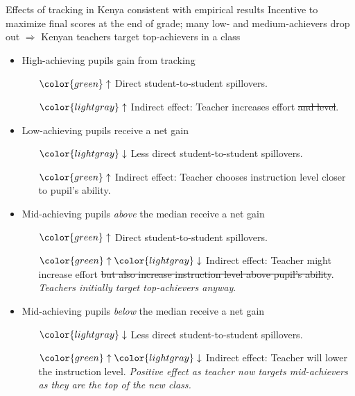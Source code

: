 \documentclass[9pt]{beamer}
\numberwithin{equation}{section}
\begin{document}
\begin{frame}{Effects of tracking in Kenya consistent with empirical results}
  Incentive to maximize final scores at the end of  grade; many low- and medium-achievers drop out $\Rightarrow$ Kenyan teachers target top-achievers in a class
  \begin{itemize}
    \item High-achieving pupils gain from tracking
    \begin{itemize}
      \item[$\color{green} \uparrow$] Direct student-to-student spillovers.
      \item[$\color{lightgray} \uparrow$] Indirect effect: Teacher increases effort \sout{and level}.
    \end{itemize}
    \item Low-achieving pupils receive a net gain
    \begin{itemize}
      \item[$\color{lightgray} \downarrow$] Less direct student-to-student spillovers.
      \item[$\color{green} \uparrow$] Indirect effect: Teacher chooses instruction level closer to pupil's ability.
    \end{itemize}
    \item Mid-achieving pupils \textit{above} the median receive a net gain
    \begin{itemize}
      \item[$\color{green}\uparrow$] Direct student-to-student spillovers.
      \item[$\color{green}\uparrow \color{lightgray}\downarrow$] Indirect effect: Teacher might increase effort \sout{but also increase instruction level above pupil's ability}. \textit{Teachers initially target top-achievers anyway}.
    \end{itemize}
    \item Mid-achieving pupils \textit{below} the median receive a net gain
    \begin{itemize}
      \item[$\color{lightgray} \downarrow$] Less direct student-to-student spillovers.
      \item[$\color{green}\uparrow \color{lightgray} \downarrow$] Indirect effect: Teacher will lower the instruction level. \textit{Positive effect as teacher now targets mid-achievers as they are the top of the new class.}
    \end{itemize}
  \end{itemize}
\end{frame}
\end{document}
